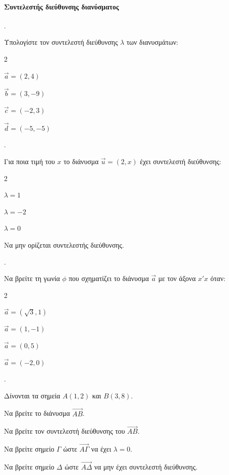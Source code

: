 \documentclass[11pt,a4paper,twocolumn]{article}
\newcounter{askhsh}
\newcommand{\askhsh}{\large\theaskhsh.\ \addtocounter{askhsh}{1}}
\begin{document}
\paragraph{Συντελεστής διεύθυνσης διανύσματος}
\askhsh Υπολογίστε τον συντελεστή διεύθυνσης $\lambda$ των διανυσμάτων:
\begin{multicols}{2}
\begin{alist}
    \item $\vec{a}=(2,4)$
    \item $\vec{b}=(3,-9)$
    \item $\vec{c}=(-2,3)$
    \item $\vec{d}=(-5,-5)$
\end{alist}
\end{multicols}

\askhsh Για ποια τιμή του $x$ το διάνυσμα $\vec{u}=(2, x)$ έχει συντελεστή διεύθυνσης:
\begin{multicols}{2}
\begin{alist}
    \item $\lambda=1$
    \item $\lambda=-2$
    \item $\lambda=0$
    \item Να μην ορίζεται συντελεστής διεύθυνσης.
\end{alist}
\end{multicols}

\askhsh Να βρείτε τη γωνία $\phi$ που σχηματίζει το διάνυσμα $\vec{a}$ με τον άξονα $x'x$ όταν:
\begin{multicols}{2}
\begin{alist}
    \item $\vec{a}=(\sqrt{3}, 1)$
    \item $\vec{a}=(1, -1)$
    \item $\vec{a}=(0, 5)$
    \item $\vec{a}=(-2, 0)$
\end{alist}
\end{multicols}

\askhsh Δίνονται τα σημεία $A(1, 2)$ και $B(3, 8)$.

\begin{alist}
    \item Να βρείτε το διάνυσμα $\vec{AB}$.
    \item Να βρείτε τον συντελεστή διεύθυνσης του $\vec{AB}$.
    \item Να βρείτε σημείο $\Gamma$ ώστε $\vec{A\Gamma}$ να έχει $\lambda=0$.
    \item Να βρείτε σημείο $\Delta$ ώστε $\vec{A\Delta}$ να μην έχει συντελεστή διεύθυνσης.
\end{alist}
\end{document}
